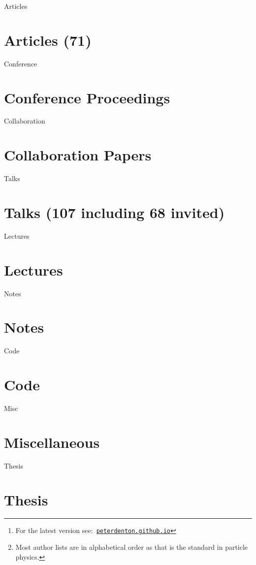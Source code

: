 \documentclass[12pt]{article}
\title{\myTitle}
\author{\myName}
\date{\small Updated: \today\footnote{For the latest version see:\ \href{http://peterdenton.github.io}{\tt peterdenton.github.io}} \footnote{Most author lists are in alphabetical order as that is the standard in particle physics.}}
\newcommand\myBib[2]{
\begin{btSect}{#2}
\section*{#1}
\btPrintAll
\end{btSect}}
\begin{document}

\maketitle



\myBib{Articles (71)}{Articles}
\myBib{Conference Proceedings}{Conference}
\myBib{Collaboration Papers}{Collaboration}
\myBib{Talks (107 including 68 invited)}{Talks}
\myBib{Lectures}{Lectures}
\myBib{Notes}{Notes}
\myBib{Code}{Code}
\myBib{Miscellaneous}{Misc}
\myBib{Thesis}{Thesis}
\end{document}
